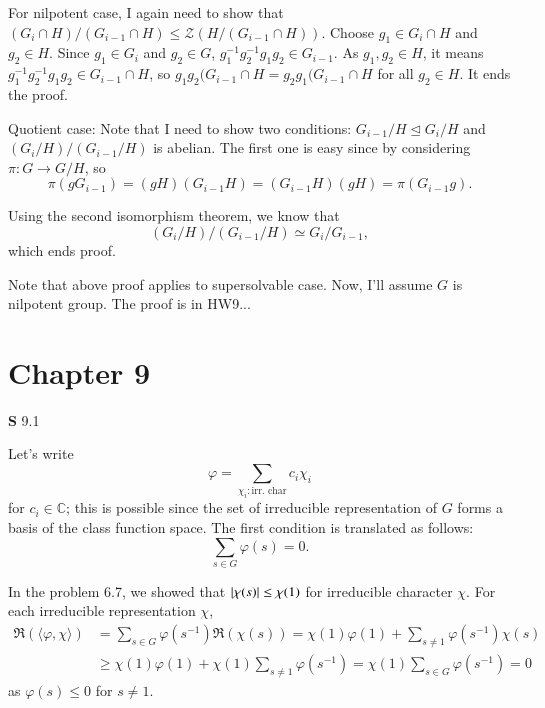 \documentclass[a4paper, 12pt]{article}
\theoremstyle{Mydefinition}
\theoremstyle{Mytheorem}
\begin{document}
For nilpotent case, I again need to show that $(G_i\cap H)/(G_{i-1}\cap H)\leq \mathcal{Z}(H/(G_{i-1}\cap H))$. Choose $g_1\in G_i\cap H$ and $g_2\in H$. Since $g_1\in G_i$ and $g_2\in G$, $g_1^{-1}g_2^{-1}g_1g_2\in G_{i-1}$. As $g_1,g_2\in H$, it means $g_1^{-1}g_2^{-1}g_1g_2\in G_{i-1}\cap H$, so $g_1g_2(G_{i-1}\cap H = g_2g_1(G_{i-1}\cap H$ for all $g_2 \in H$. It ends the proof.

Quotient case: 
Note that I need to show two conditions: $G_{i-1}/H\trianglelefteq G_{i}/H$ and $(G_i/H)/(G_{i-1}/H)$ is abelian. The first one is easy since by considering $\pi:G\rightarrow G/H$, so 
\begin{equation}
    \pi(gG_{i-1}) = (gH)(G_{i-1}H) = (G_{i-1}H)(gH) =  \pi(G_{i-1}g).
\end{equation}

Using the second isomorphism theorem, we know that
\begin{equation}
    (G_i/H)/(G_{i-1}/H)\simeq G_i/G_{i-1},
\end{equation}
which ends proof.

Note that above proof applies to supersolvable case. Now, I'll assume $G$ is nilpotent group. The proof is in HW9...\\

\newpage

\section{Chapter 9}

\noindent \textbf{S} 9.1

Let's write
\begin{equation}
    \varphi = \sum_{\chi_i:\textrm{irr. char}}c_i\chi_i
\end{equation}
for $c_i\in\mathbb{C}$; this is possible since the set of irreducible representation of $G$ forms a basis of the class function space. The first condition is translated as follows:
\begin{equation}
    \sum_{s\in G}\varphi(s) = 0.
\end{equation}

In the problem 6.7, we showed that $\abs{\chi(s)}\leq \chi(1)$ for irreducible character $\chi$. For each irreducible representation $\chi$,
\begin{equation}
\begin{split}
    \Re\left(\langle \varphi, \chi\rangle\right) &= \sum_{s\in G}\varphi(s^{-1})\Re\left(\chi(s)\right)=\chi(1)\varphi(1)+\sum_{s\neq 1}\varphi(s^{-1})\chi(s)\\
    &\geq \chi(1)\varphi(1)+\chi(1)\sum_{s\neq 1}\varphi(s^{-1})=\chi(1)\sum_{s\in G}\varphi(s^{-1}) = 0
\end{split}
\end{equation}
as $\varphi(s)\leq 0$ for $s\neq 1$.
\end{document}
